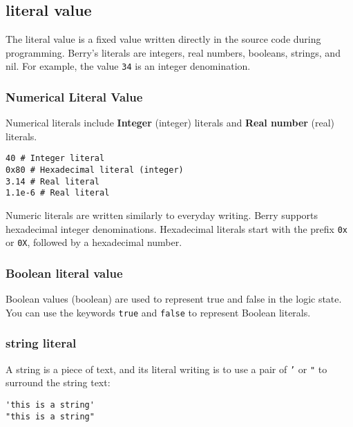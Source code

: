 \subsection {literal value}

The literal value is a fixed value written directly in the source code during programming. Berry's literals are integers, real numbers, booleans, strings, and nil. For example, the value \texttt{34} is an integer denomination.

\subsubsection {Numerical Literal Value}

Numerical literals include \textbf{Integer} (integer) literals and \textbf{Real number} (real) literals.
\begin{lstlisting}[language=berry, numbers=none]
40 # Integer literal
0x80 # Hexadecimal literal (integer)
3.14 # Real literal
1.1e-6 # Real literal
\end{lstlisting}

Numeric literals are written similarly to everyday writing. Berry supports hexadecimal integer denominations. Hexadecimal literals start with the prefix \texttt{0x} or \texttt{0X}, followed by a hexadecimal number.

\subsubsection {Boolean literal value}

Boolean values   (boolean) are used to represent true and false in the logic state. You can use the keywords \texttt{true} and \texttt{false} to represent Boolean literals.

\subsubsection{string literal}

A string is a piece of text, and its literal writing is to use a pair of \texttt{'} or \texttt{"} to surround the string text:
\begin{lstlisting}[language=berry, numbers=none]
'this is a string'
"this is a string"
\end{lstlisting}

